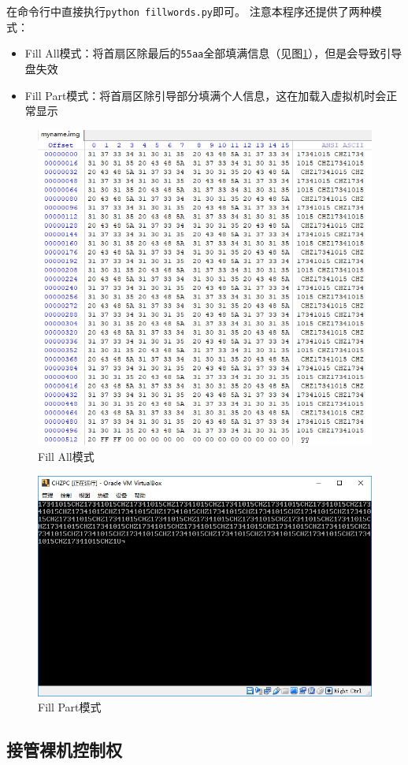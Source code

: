 \documentclass[logo,reportComp]{thesis}
\begin{document}
在命令行中直接执行\verb'python fillwords.py'即可。
注意本程序还提供了两种模式：
\begin{itemize}
	\item Fill All模式：将首扇区除最后的\verb'55aa'全部填满信息（见图\ref{fig:fillall}），但是会导致引导盘失效
	\item Fill Part模式：将首扇区除引导部分填满个人信息，这在加载入虚拟机时会正常显示
\end{itemize}
\begin{figure}[H]
\centering
\includegraphics[width=0.8\linewidth]{fig/fillall.PNG}
\caption{Fill All模式}
\label{fig:fillall}
\end{figure}
\begin{figure}[H]
\centering
\includegraphics[width=0.8\linewidth]{fig/fillpart.PNG}
\caption{Fill Part模式}
\label{fig:fillpart}
\end{figure}


\subsection{接管裸机控制权}
\end{document}
